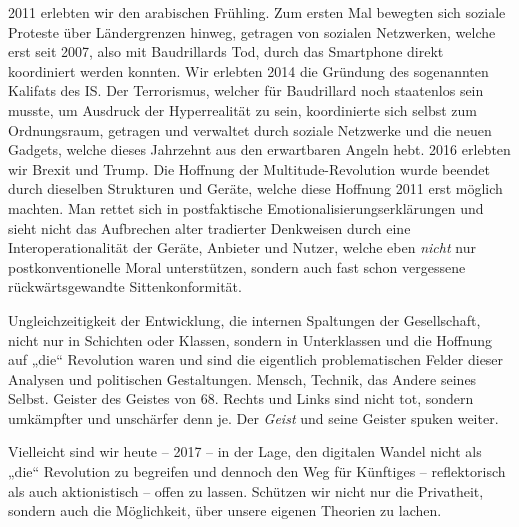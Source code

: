 \documentclass[12pt,a4paper]{article}
\begin{document}
2011 erlebten wir den arabischen Frühling. Zum ersten Mal bewegten sich
soziale Proteste über Ländergrenzen hinweg, getragen von sozialen Netzwerken,
welche erst seit 2007, also mit Baudrillards Tod, durch das Smartphone direkt
koordiniert werden konnten. Wir erlebten 2014 die Gründung des sogenannten
Kalifats des IS. Der Terrorismus, welcher für Baudrillard noch staatenlos sein
musste, um Ausdruck der Hyperrealität zu sein, koordinierte sich selbst zum
Ordnungsraum, getragen und verwaltet durch soziale Netzwerke und die neuen
Gadgets, welche dieses Jahrzehnt aus den erwartbaren Angeln hebt. 2016
erlebten wir Brexit und Trump. Die Hoffnung der Multitude-Revolution wurde
beendet durch dieselben Strukturen und Geräte, welche diese Hoffnung 2011 erst
möglich machten.  Man rettet sich in postfaktische
Emotionalisierungserklärungen und sieht nicht das Aufbrechen alter tradierter
Denkweisen durch eine Interoperationalität der Geräte, Anbieter und Nutzer,
welche eben \emph{nicht} nur postkonventionelle Moral unterstützen, sondern
auch fast schon vergessene rückwärtsgewandte Sittenkonformität.

Ungleichzeitigkeit der Entwicklung, die internen Spaltungen der Gesellschaft,
nicht nur in Schichten oder Klassen, sondern in Unterklassen und die Hoffnung
auf „die“ Revolution waren und sind die eigentlich problematischen Felder
dieser Analysen und politischen Gestaltungen. Mensch, Technik, das Andere
seines Selbst. Geister des Geistes von 68.  Rechts und Links sind nicht tot,
sondern umkämpfter und unschärfer denn je. Der \emph{Geist} und seine Geister
spuken weiter.

Vielleicht sind wir heute -- 2017 -- in der Lage, den digitalen Wandel nicht
als „die“ Revolution zu begreifen und dennoch den Weg für Künftiges --
reflektorisch als auch aktionistisch -- offen zu lassen. Schützen wir nicht
nur die Privatheit, sondern auch die Möglichkeit, über unsere eigenen Theorien
zu lachen.

\ccnotiz
\end{document}
